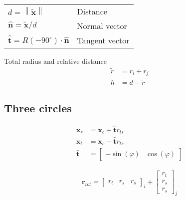 \begin{table}[H]
\begin{tabularx}{1.0\linewidth}{ll}
\hline
\hline
$ d = \left\|\tilde{\mathbf{x}}\right\| $ & Distance\\
$ \hat{\mathbf{n}} = \tilde{\mathbf{x}} / d $ & Normal vector \\
$ \hat{\mathbf{t}} = R(-90^{\circ}) \cdot \hat{\mathbf{n}} $ & Tangent vector \\
\hline
\hline
\end{tabularx}
\end{table}

Total radius and relative distance
\begin{align}
\tilde{r} &= r_{i} + r_{j} \\
h &= d - \tilde{r}
\end{align}


\subsection{Three circles}

\begin{align}
\mathbf{x}_{r} &= \mathbf{x}_{c} + \hat{\mathbf{t}} r_{ts}  \\
\mathbf{x}_{l} &= \mathbf{x}_{c} - \hat{\mathbf{t}} r_{ts} \\
\hat{\mathbf{t}} &= \begin{bmatrix} -\sin(\varphi) & \cos(\varphi) \end{bmatrix}
\end{align}

\begin{align}
\mathbf{r}_{tot} = \begin{bmatrix} r_{t} & r_{s} & r_{s} \end{bmatrix}_{i} + \begin{bmatrix} r_{t} \\ r_{s} \\ r_{s} \end{bmatrix}_{j}
\end{align}

